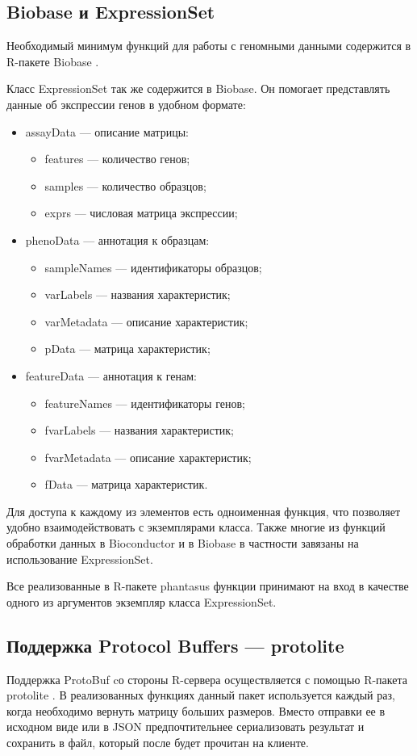 \documentclass[specification,annotation]{itmo-student-thesis}
\begin{document}
\subsection{Biobase и ExpressionSet}
Необходимый минимум функций для работы с геномными данными содержится в R-пакете Biobase \cite{biobase}.

Класс ExpressionSet \cite{expressionset} так же содержится в Biobase. Он помогает представлять данные об экспрессии генов в удобном формате:
\begin{itemize}
\item assayData --- описание матрицы:\begin{itemize}
\item features --- количество генов;
\item samples --- количество образцов;
\item exprs --- числовая матрица экспрессии; \end{itemize}
\item phenoData --- аннотация к образцам:\begin{itemize}
\item sampleNames --- идентификаторы образцов;
\item varLabels --- названия характеристик;
\item varMetadata --- описание характеристик;
\item pData --- матрица характеристик;\end{itemize}
\item featureData --- аннотация к генам:\begin{itemize}
\item featureNames --- идентификаторы генов;
\item fvarLabels --- названия характеристик;
\item fvarMetadata --- описание характеристик;
\item fData --- матрица характеристик.\end{itemize}
\end{itemize}

Для доступа к каждому из элементов есть одноименная функция, что позволяет удобно взаимодействовать с экземплярами класса. Также многие из функций обработки данных в Bioconductor и в Biobase в частности завязаны на использование ExpressionSet.

Все реализованные в R-пакете phantasus функции принимают на вход в качестве одного из аргументов экземпляр класса ExpressionSet.

\subsection{Поддержка Protocol Buffers --- protolite}
Поддержка ProtoBuf cо стороны R-сервера осуществляется с помощью R-пакета protolite \cite{protolite}. В реализованных функциях данный пакет используется каждый раз, когда необходимо вернуть матрицу больших размеров. Вместо отправки ее в исходном виде или в JSON предпочтительнее сериализовать результат и сохранить в файл, который после будет прочитан на клиенте.
\end{document}
